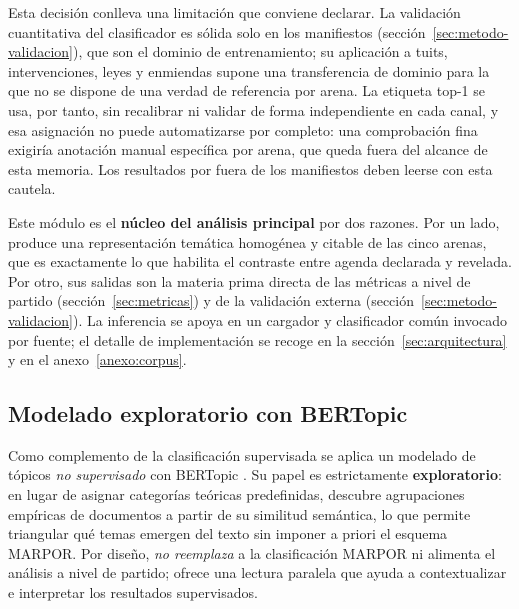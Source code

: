Esta decisión conlleva una limitación que conviene declarar. La validación
cuantitativa del clasificador es sólida solo en los manifiestos
(sección~\ref{sec:metodo-validacion}), que son el dominio de entrenamiento; su
aplicación a tuits, intervenciones, leyes y enmiendas supone una transferencia de
dominio para la que no se dispone de una verdad de referencia por arena. La
etiqueta top-1 se usa, por tanto, sin recalibrar ni validar de forma
independiente en cada canal, y esa asignación no puede automatizarse por completo:
una comprobación fina exigiría anotación manual específica por arena, que queda
fuera del alcance de esta memoria. Los resultados por fuera de los manifiestos
deben leerse con esta cautela.

Este módulo es el \textbf{núcleo del análisis principal} por dos razones. Por un
lado, produce una representación temática homogénea y citable de las cinco
arenas, que es exactamente lo que habilita el contraste entre agenda declarada y
revelada. Por otro, sus salidas son la materia prima directa de las métricas a
nivel de partido (sección~\ref{sec:metricas}) y de la validación externa
(sección~\ref{sec:metodo-validacion}). La inferencia se apoya en un cargador y
clasificador común invocado por fuente; el detalle de implementación se recoge en
la sección~\ref{sec:arquitectura} y en el anexo~\ref{anexo:corpus}.

\subsection{Modelado exploratorio con BERTopic}
\label{sec:metodo-bertopic}

Como complemento de la clasificación supervisada se aplica un modelado de tópicos
\emph{no supervisado} con BERTopic \cite{grootendorst2022bertopic}. Su papel es
estrictamente \textbf{exploratorio}: en lugar de asignar categorías teóricas
predefinidas, descubre agrupaciones empíricas de documentos a partir de su
similitud semántica, lo que permite triangular qué temas emergen del texto sin
imponer a priori el esquema MARPOR. Por diseño, \emph{no reemplaza} a la
clasificación MARPOR ni alimenta el análisis a nivel de partido; ofrece una
lectura paralela que ayuda a contextualizar e interpretar los resultados
supervisados.

